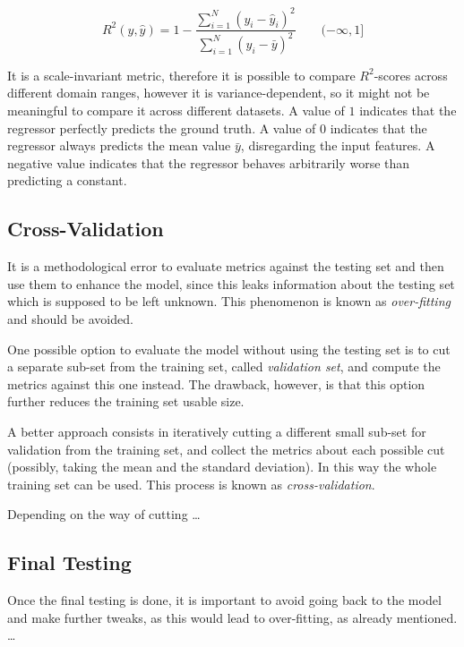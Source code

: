 \[
	R^2(y, \hat{y}) = 1 - \frac{
		\sum_{i=1}^{N} (y_i - \hat{y}_i)^2
	}{
		\sum_{i=1}^{N} (y_i - \bar{y})^2
	} \qquad (-\infty, 1]
\]

It is a scale-invariant metric, therefore it is possible to compare $R^2$-scores across different domain ranges, however it is variance-dependent, so it might not be meaningful to compare it across different datasets.
A value of $1$ indicates that the regressor perfectly predicts the ground truth. A value of $0$ indicates that the regressor always predicts the mean value $\bar{y}$, disregarding the input features. A negative value indicates that the regressor behaves arbitrarily worse than predicting a constant.

\subsection{Cross-Validation}

It is a methodological error to evaluate metrics against the testing set and then use them to enhance the model, since this leaks information about the testing set which is supposed to be left unknown. This phenomenon is known as \emph{over-fitting} and should be avoided.

One possible option to evaluate the model without using the testing set is to cut a separate sub-set from the training set, called \emph{validation set}, and compute the metrics against this one instead. The drawback, however, is that this option further reduces the training set usable size.

A better approach consists in iteratively cutting a different small sub-set for validation from the training set, and collect the metrics about each possible cut (possibly, taking the mean and the standard deviation). In this way the whole training set can be used. This process is known as \emph{cross-validation}.

Depending on the way of cutting \dots {}


\subsection{Final Testing}

Once the final testing is done, it is important to avoid going back to the model and make further tweaks, as this would lead to over-fitting, as already mentioned. \dots {}